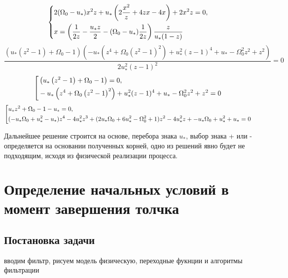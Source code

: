 \documentclass[a4paper,12pt, openany]{book}
\theoremstyle{plain} %
\theoremstyle{definition} %
\theoremstyle{remark} %
\numberwithin{equation}{chapter}
\begin{document}
{\begin{equation}
    \left\{ {\begin{aligned}
                 & 2(\Omega_0-u_*)x^2z+u_*\left(2\frac{x^2}{z}+4zx-4x\right)+2x^2z=0, \hfill                       \\
                 & x=\left( \frac{1}{2z}-\frac{u_*z}{2}-(\Omega_0-u_*)\frac{1}{2z}\right)\frac{z}{u_*(1-z)} \hfill \\
            \end{aligned}} \right.
\end{equation}
\[
    \frac{\left(u_* \left(z^2-1\right)+\Omega _0-1\right) \left(-u_* \left(z^4+\Omega _0 \left(z^2-1\right)^2\right)+u_*^2 (z-1)^4+u_*-\Omega _0^2 z^2+z^2\right)}{2 u_*^2 (z-1)^2}=0
\]
\begin{equation}
    \left[ {\begin{aligned}
                 & \left(u_* \left(z^2-1\right)+\Omega _0-1\right)=0, \hfill                                           \\
                 & -u_* \left(z^4+\Omega _0 \left(z^2-1\right)^2\right)+u_*^2 (z-1)^4+u_*-\Omega _0^2 z^2+z^2=0 \hfill \\
            \end{aligned}} \right.
\end{equation}
\begin{equation}\label{final_polynom}
    \left[ {\begin{aligned}
                 & u_*z^2+\Omega _0-1-u_*=0, \hfill                                                                                               \\
                 & (-u_* \Omega _0+u_*^2-u_*)z^4-4 u_*^2z^3+(2 u_* \Omega _0+6 u_*^2-\Omega _0^2+1)z^2-4 u_*^2z+-u_* \Omega _0+u_*^2+u_*=0 \hfill \\
            \end{aligned}} \right.
\end{equation}

Дальнейшее решение строится на основе, перебора знака $u_\ast$, выбор знака + или - определяется на основании полученных корней,
одно из решений явно будет не подходящим, исходя из физической реализации процесса.



\newpage
\chapter{Определение начальных условий в момент завершения толчка}
\section{Постановка задачи}
вводим фильтр, рисуем модель физическую, переходные фукнции и алгоритмы фильтрации

}
\end{document}
